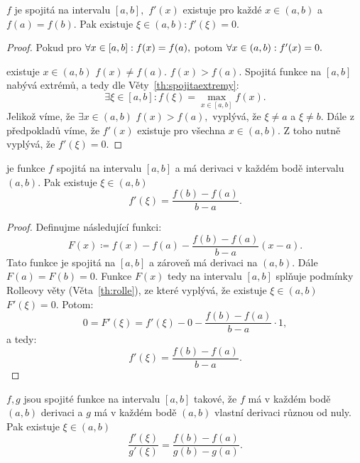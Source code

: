 \begin{theorem}[Rolleova]
    \label{th:rolle}
    \Necht $f$ je spojitá na intervalu $[a,b],$ $f'(x)$ existuje pro každé
    $x \in (a,b)$ a $f(a) = f(b).$ Pak existuje $\xi \in (a,b): f'(\xi) = 0.$
\end{theorem}

\begin{proof}
    Pokud pro $\forall x \in [a,b]: f(x) = f(a),$ potom $\forall x \in (a,b): f'(x) = 0.$ 

    \Necht existuje $x \in (a,b)$ \tz $f(x) \neq f(a).$ \Necht \buno $f(x) > f(a).$
    Spojitá funkce na $[a,b]$ nabývá extrémů, a tedy dle Věty~\ref{th:spojitaextremy}:
    $$\exists \xi \in [a,b]: f(\xi) = \max_{x \in [a,b]} f(x).$$
    Jelikož víme, že $\exists x \in (a,b)$ \tz $f(x) > f(a),$ vyplývá, že $\xi \neq a$
    a $\xi \neq b.$ Dále z předpokladů víme, že $f'(x)$ existuje pro všechna 
    $x \in (a,b).$ Z toho nutně vyplývá, že $f'(\xi) = 0.$
\end{proof}

\begin{theorem}
    \label{th:lagrangemean}
    \Necht je funkce $f$ spojitá na intervalu $[a,b]$ a má derivaci v každém bodě
    intervalu $(a,b).$ Pak existuje $\xi \in (a,b)$ \tz
    $$f'(\xi) = \frac{f(b) - f(a)}{b -a}.$$
\end{theorem}

\begin{proof}
    Definujme následující funkci:
    $$F(x) \coloneqq f(x) - f(a) - \frac{f(b) - f(a)}{b - a}(x-a).$$
    Tato funkce je spojitá na $[a,b]$ a zároveň má derivaci na $(a,b).$ Dále
    $F(a) = F(b) = 0.$ Funkce $F(x)$ tedy na intervalu $[a,b]$ splňuje podmínky
    Rolleovy věty (Věta~\ref{th:rolle}), ze které vyplývá, že existuje $\xi \in
    (a,b)$ \tz $F'(\xi) = 0.$ Potom:
    $$0 = F'(\xi) = f'(\xi) - 0 - \frac{f(b) - f(a)}{b-a} \cdot 1,$$
    a tedy:
    $$f'(\xi) = \frac{f(b) - f(a)}{b-a}.$$
\end{proof}

\begin{theorem}
    \label{th:cauchymean}
    \Necht $f,g$ jsou spojité funkce na intervalu $[a,b]$ takové, že $f$ má v každém
    bodě $(a,b)$ derivaci a $g$ má v každém bodě $(a,b)$ vlastní derivaci různou 
    od nuly. Pak existuje $\xi \in (a,b)$ \tz
    $$\frac{f'(\xi)}{g'(\xi)} = \frac{f(b) - f(a)}{g(b) - g(a)}.$$
\end{theorem}

